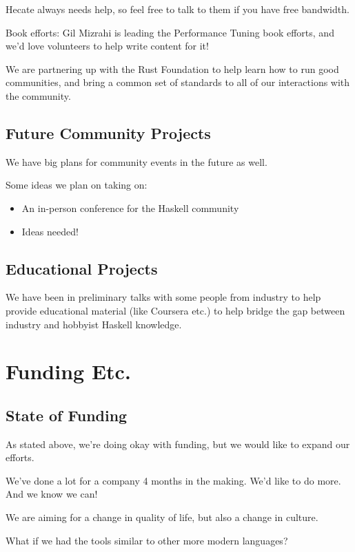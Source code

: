 \documentclass[tikz]{beamer}
\theoremstyle{definition}
\begin{document}
\frame
{ 
	Hecate always needs help, so feel free to talk to them if you have free bandwidth. 
}

\frame 
{ 
	Book efforts: Gil Mizrahi is leading the Performance Tuning book efforts, and we'd love volunteers to help write content for it!
	
}

\frame
{ 
	We are partnering up with the Rust Foundation to help learn how to run good communities, and bring a common set of standards to all of our interactions with the community. 
}

\subsection{Future Community Projects}
\frame
{ 
	We have big plans for community events in the future as well. 
}

\frame
{ 
	Some ideas we plan on taking on: 
	
	\begin{itemize}
		\item An in-person conference for the Haskell community
		\item Ideas needed!
	\end{itemize}
} 

\subsection{Educational Projects}

\frame
{ 
	We have been in preliminary talks with some people from industry to help provide educational material (like Coursera etc.) to help bridge the gap between industry and hobbyist Haskell knowledge.
} 

\section{Funding Etc.}
\subsection{State of Funding}
\frame
{ 
	As stated above, we're doing okay with funding, but we would like to expand our efforts. 
} 

\frame
{ 
	We've done a lot for a company 4 months in the making. We'd like to do more. And we know we can!
} 

\frame
{ 
	We are aiming for a change in quality of life, but also a change in culture. 
} 

\frame
{ 
	What if we had the tools similar to other more modern languages? 

} 
\end{document}
